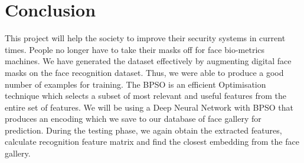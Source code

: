 \documentclass[a4paper,12pt]{report}
\begin{document}
\chapter{Conclusion}
This project will help the society to improve their security systems in current times. People no longer have to take their masks off for face bio-metrics machines. We have generated the dataset effectively by augmenting digital face masks on the face recognition dataset. Thus, we were able to produce a good number of examples for training. The BPSO is an efficient Optimisation technique which selects a subset of most relevant and useful features from the entire set of features. We will be using a Deep Neural Network with BPSO that produces an encoding which we save to our database of face gallery for prediction. During the testing phase, we again obtain the extracted features, calculate recognition feature matrix and find the closest embedding from the face gallery. 


\end{document}

